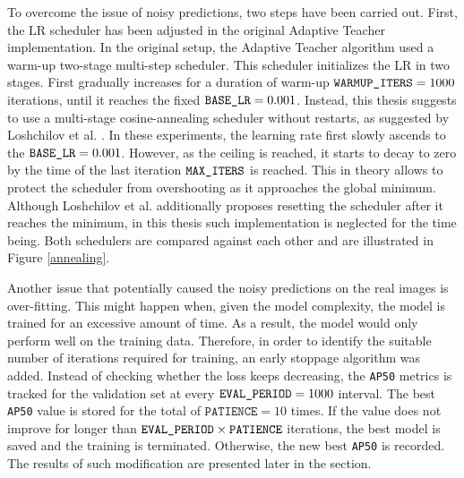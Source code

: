 To overcome the issue of noisy predictions, two steps have been carried out. First, the LR scheduler has been adjusted in the original Adaptive Teacher \cite{Li2021} implementation. In the original setup, the Adaptive Teacher algorithm used a warm-up two-stage multi-step scheduler. This scheduler initializes the LR in two stages.  First gradually increases for a duration of warm-up $\texttt{WARMUP\textunderscore ITERS} = 1000$ iterations, until it reaches the fixed $\texttt{BASE\textunderscore LR} = 0.001$.  Instead, this thesis suggests to use a multi-stage cosine-annealing scheduler without restarts, as suggested by Loshchilov et al. \cite{Loshchilov2016}. In these experiments, the learning rate first slowly ascends to the $\texttt{BASE\textunderscore LR} = 0.001$. However, as the ceiling is reached, it starts to decay to zero by the time of the last iteration $\texttt{MAX\textunderscore ITERS}$ is reached. This in theory allows to protect the scheduler from overshooting as it approaches the global minimum. Although Loshchilov et al. additionally proposes resetting the scheduler after it reaches the minimum, in this thesis such implementation is neglected for the time being. Both schedulers are compared against each other and are illustrated in Figure \ref{annealing}.

Another issue that potentially caused the noisy predictions on the real images is over-fitting. This might happen when, given the model complexity, the model is trained for an excessive amount of time. As a result, the model would only perform well on the training data. 
Therefore, in order to identify the suitable number of iterations required for training, an early stoppage algorithm was added. Instead of checking whether the loss keeps decreasing, the \texttt{AP50} metrics is tracked for the validation set at every $\texttt{EVAL\textunderscore PERIOD} = 1000$ interval. The best \texttt{AP50} value is stored for the total of $\texttt{PATIENCE} = 10$ times. If the value does not improve for longer than $\texttt{EVAL\textunderscore PERIOD} \times \texttt{PATIENCE}$ iterations, the best model is saved and the training is terminated. Otherwise, the new best \texttt{AP50} is recorded. The results of such modification are presented later in the  section.  

